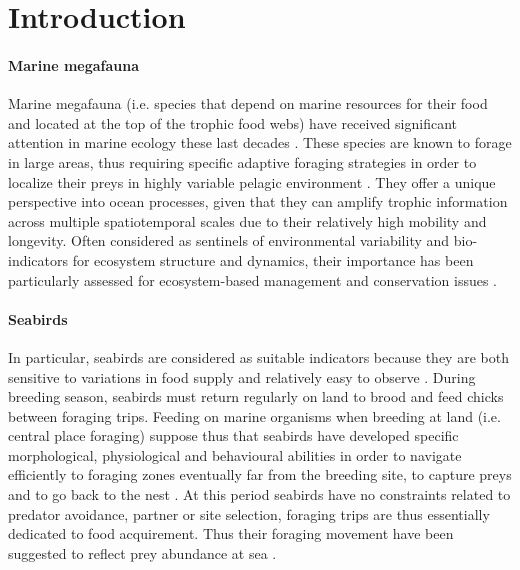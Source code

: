 \documentclass{article}
\begin{document}

\section{Introduction}
\paragraph{Marine megafauna}
Marine megafauna (i.e. species that depend on marine resources for their food and located at the top of the trophic food webs) have received significant attention in marine ecology these last decades \cite{authier_conservation_2017}.
These species are known to forage in large areas, thus requiring specific adaptive foraging strategies in order to localize their preys in highly variable pelagic environment \cite{hazen_marine_2019}.
They offer a unique perspective into ocean processes, given that they can  amplify  trophic  information  across  multiple spatiotemporal scales due to their relatively high mobility and longevity.
Often considered as sentinels of environmental variability and bio-indicators for ecosystem structure and dynamics, their importance has been particularly assessed for ecosystem-based management and conservation issues \cite{lascelles_migratory_2014, hays_key_2016, hooker_marine_2004}.

\paragraph{Seabirds}
In particular, seabirds are considered as suitable indicators because they are both sensitive to variations in food supply and relatively easy to observe \cite{furness_seabirds_1997, wakefield_quantifying_2009}.
During breeding season, seabirds must return regularly on land to brood and feed chicks between foraging trips.
Feeding on marine organisms when breeding at land (i.e. central place foraging) suppose thus that seabirds have developed specific morphological, physiological and behavioural abilities in order to navigate efficiently to foraging zones eventually far from the breeding site, to capture preys and to go back to the nest \cite{schreiber_biology_2001}.
At this period seabirds have no constraints related to predator avoidance, partner or site selection, foraging trips are thus essentially dedicated to food acquirement. Thus their foraging movement have been suggested to reflect prey abundance at sea \cite{weimerskirch_are_2007}.
\end{document}

